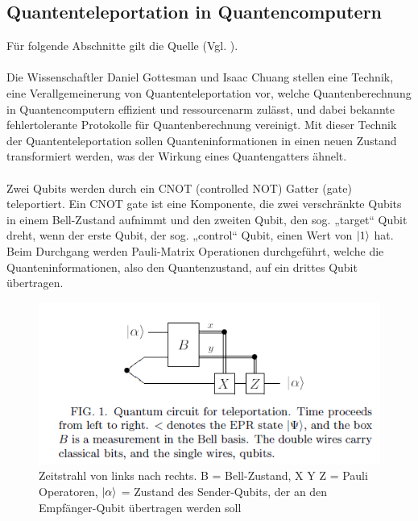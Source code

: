\subsection{Quantenteleportation in Quantencomputern}
Für folgende Abschnitte gilt die Quelle (Vgl. \cite[S.1-2]{gottesman_quantum_1999}).\\
\\
Die Wissenschaftler Daniel Gottesman und Isaac Chuang stellen eine Technik, eine Verallgemeinerung von Quantenteleportation vor, welche Quantenberechnung in Quantencomputern effizient und ressourcenarm zulässt, und dabei bekannte fehlertolerante Protokolle für Quantenberechnung vereinigt. Mit dieser Technik der Quantenteleportation sollen Quanteninformationen in einen neuen Zustand transformiert werden, was der Wirkung eines Quantengatters ähnelt.\\
\\
Zwei Qubits werden durch ein CNOT (controlled NOT) Gatter (gate) teleportiert. Ein CNOT gate ist eine Komponente, die zwei verschränkte Qubits in einem Bell-Zustand aufnimmt und den zweiten Qubit, den sog. „target“ Qubit dreht, wenn der erste Qubit, der sog. „control“ Qubit, einen Wert von \(\ket{1}\) hat. Beim Durchgang werden Pauli-Matrix Operationen durchgeführt, welche die Quanteninformationen, also den Quantenzustand, auf ein drittes Qubit übertragen.\\
\begin{figure}[h!]
    \centering
    \includegraphics[width=1.0\textwidth]{images/quantum-information/quantenteleportation_cnot_1.png}
    \caption{Zeitstrahl von links nach rechts. B = Bell-Zustand, X Y Z = Pauli Operatoren, \(\ket{\alpha}\) = Zustand des Sender-Qubits, der an den Empfänger-Qubit übertragen werden soll}
    \label{fig:meinbild}
\end{figure}
\newpage
